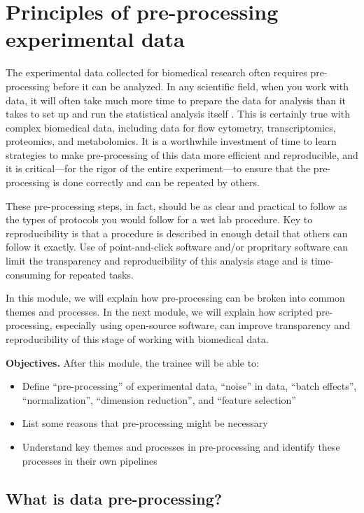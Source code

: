 \documentclass[]{tufte-book}
\providecommand{\tightlist}{%
  \setlength{\itemsep}{0pt}\setlength{\parskip}{0pt}}
\begin{document}
\section{Principles of pre-processing experimental data}\label{module12}

The experimental data collected for biomedical research often requires
pre-processing before it can be analyzed. In any scientific field, when you work
with data, it will often take much more time to prepare the data for analysis
than it takes to set up and run the statistical analysis itself
\citep{robinson2014broom}. This is certainly true with complex biomedical data,
including data for flow cytometry, transcriptomics, proteomics, and
metabolomics. It is a worthwhile investment of time to learn strategies to make
pre-processing of this data more efficient and reproducible, and it is
critical---for the rigor of the entire experiment---to ensure that the
pre-processing is done correctly and can be repeated by others.

These pre-processing steps, in fact, should be as clear and practical to follow
as the types of protocols you would follow for a wet lab procedure. Key to
reproducibility is that a procedure is described in enough detail that others
can follow it exactly. Use of point-and-click software and/or propritary
software can limit the transparency and reproducibility of this analysis stage
and is time-consuming for repeated tasks.

In this module, we will explain how pre-processing can be broken into common
themes and processes. In the next module, we will explain how scripted
pre-processing, especially using open-source software, can improve transparency
and reproducibility of this stage of working with biomedical data.

\textbf{Objectives.} After this module, the trainee will be able to:

\begin{itemize}
\tightlist
\item
  Define ``pre-processing'' of experimental data, ``noise'' in data, ``batch effects'',
  ``normalization'', ``dimension reduction'', and ``feature selection''
\item
  List some reasons that pre-processing might be necessary
\item
  Understand key themes and processes in pre-processing and identify these
  processes in their own pipelines
\end{itemize}

\subsection{What is data pre-processing?}\label{what-is-data-pre-processing}
\end{document}
